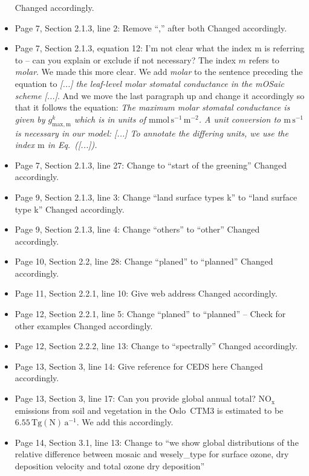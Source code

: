 \begin{itemize}
  Changed accordingly.
\item {\color{blue}Page 7, Section 2.1.3, line 2: Remove “,” after both}
  Changed accordingly.
\item {\color{blue}Page 7, Section 2.1.3, equation 12: I’m not clear what the index m is referring to – can you explain or exclude if not necessary?}
  The index $m$ refers to \emph{molar}. We made this more clear. We add \emph{molar} to the sentence preceding the equation to \emph{[...] the leaf-level molar stomatal conductance in the mOSaic scheme [...]}.
  And we move the last paragraph up and change it accordingly so that it follows the equation: \emph{The maximum molar stomatal conductance is given by $g^k_\mathrm{max, m}$ which is in units of $\mathrm{mmol\,s^{-1}\,m^{-2}}$. A unit conversion to $\mathrm{m\,s^{-1}}$ is necessary in our model: [...] To annotate the differing units, we use the index $\mathrm{m}$ in Eq.~([...]).}
\item {\color{blue}Page 7, Section 2.1.3, line 27: Change to “start of the greening”}
  Changed accordingly.
\item {\color{blue}Page 9, Section 2.1.3, line 3: Change “land surface types k” to “land surface type k” }
  Changed accordingly.
\item {\color{blue}Page 9, Section 2.1.3, line 4: Change “others” to “other”}
  Changed accordingly.
\item {\color{blue}Page 10, Section 2.2, line 28: Change “planed” to “planned”}
  Changed accordingly.
\item {\color{blue}Page 11, Section 2.2.1, line 10: Give web address}
  Changed accordingly.
\item {\color{blue}Page 12, Section 2.2.1, line 5: Change “planed” to “planned” – Check for other examples}
  Changed accordingly.
\item {\color{blue}Page 12, Section 2.2.2, line 13: Change to “spectrally”}
  Changed accordingly.
\item {\color{blue}Page 13, Section 3, line 14: Give reference for CEDS here}
  Changed accordingly.
\item {\color{blue}Page 13, Section 3, line 17: Can you provide global annual total?}
  $\mathrm{NO_x}$ emissions from soil and vegetation in the Oslo~CTM3 is estimated to be $6.55\,\mathrm{Tg(N)\,a^{-1}}$. We add this accordingly.
\item {\color{blue}Page 14, Section 3.1, line 13: Change to “we show global distributions of the relative difference between mosaic and wesely\_type for surface ozone, dry deposition velocity and total ozone dry deposition”}

\end{itemize}
